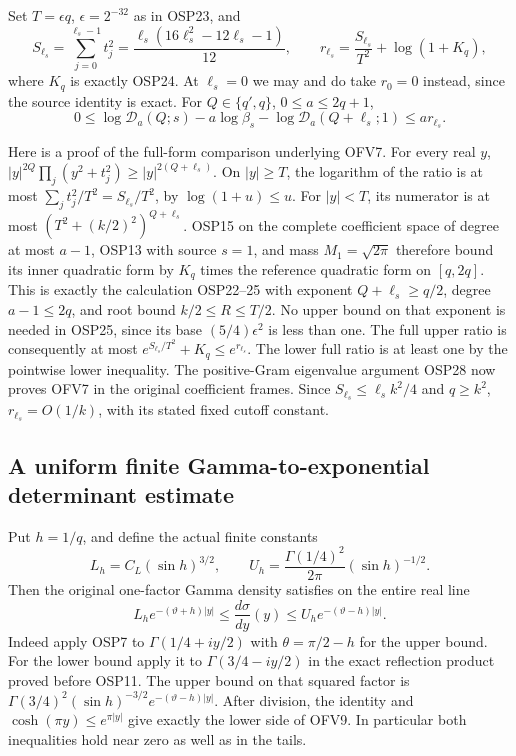 \documentclass[11pt,a4paper]{article}
\begin{document}
Set $T=\epsilon q$, $\epsilon=2^{-32}$ as in OSP23, and
\[
S_{\ell_s}=\sum_{j=0}^{\ell_s-1}t_j^2
=\frac{\ell_s(16\ell_s^2-12\ell_s-1)}{12},\qquad
r_{\ell_s}=\frac{S_{\ell_s}}{T^2}+\log(1+K_q),
\tag{OFV6}
\]
where $K_q$ is exactly OSP24. At $\ell_s=0$ we may and do take
$r_0=0$ instead, since the source identity is exact.
For $Q\in\{q',q\}$, $0\le a\le2q+1$,
\[
0\le
\log\mathcal D_a(Q;s)-a\log\beta_s
-\log\mathcal D_a(Q+\ell_s;1)
\le ar_{\ell_s}.
\tag{OFV7}
\]

Here is a proof of the full-form comparison underlying OFV7.
For every real $y$,
$|y|^{2Q}\prod_j(y^2+t_j^2)\ge |y|^{2(Q+\ell_s)}$.
On $|y|\ge T$, the logarithm of the ratio is at most
$\sum_jt_j^2/T^2=S_{\ell_s}/T^2$, by $\log(1+u)\le u$.
For $|y|<T$, its numerator is at most
$(T^2+(k/2)^2)^{Q+\ell_s}$.
OSP15 on the complete coefficient space of degree at most $a-1$,
OSP13 with source $s=1$, and mass $M_1=\sqrt{2\pi}$ therefore
bound its inner quadratic form by $K_q$ times the reference
quadratic form on $[q,2q]$. This is exactly the calculation
OSP22--25 with exponent $Q+\ell_s\ge q/2$, degree $a-1\le2q$,
and root bound $k/2\le R\le T/2$.
No upper bound on that exponent is needed in OSP25, since its
base $(5/4)\epsilon^2$ is less than one.
The full upper ratio is consequently at most
$e^{S_{\ell_s}/T^2}+K_q\le e^{r_{\ell_s}}$.
The lower full ratio is at least one by the pointwise lower
inequality. The positive-Gram eigenvalue argument OSP28 now proves
OFV7 in the original coefficient frames.
Since $S_{\ell_s}\le\ell_s k^2/4$ and $q\ge k^2$,
$r_{\ell_s}=O(1/k)$, with its stated fixed cutoff constant.

\subsection{A uniform finite Gamma-to-exponential determinant estimate}

Put $h=1/q$, and define the actual finite constants
\[
L_h=C_L(\sin h)^{3/2},\qquad
U_h=\frac{\Gamma(1/4)^2}{2\pi}(\sin h)^{-1/2}.
\tag{OFV8}
\]
Then the original one-factor Gamma density satisfies on the entire
real line
\[
L_he^{-(\vartheta+h)|y|}
\le\frac{d\sigma}{dy}(y)
\le U_he^{-(\vartheta-h)|y|}.
\tag{OFV9}
\]
Indeed apply OSP7 to $\Gamma(1/4+iy/2)$ with
$\theta=\pi/2-h$ for the upper bound.
For the lower bound apply it to $\Gamma(3/4-iy/2)$ in the exact
reflection product proved before OSP11. The upper bound on that
squared factor is
$\Gamma(3/4)^2(\sin h)^{-3/2}e^{-(\vartheta-h)|y|}$.
After division, the identity and
$\cosh(\pi y)\le e^{\pi|y|}$ give exactly the lower side of OFV9.
In particular both inequalities hold near zero as well as in
the tails.
\end{document}

